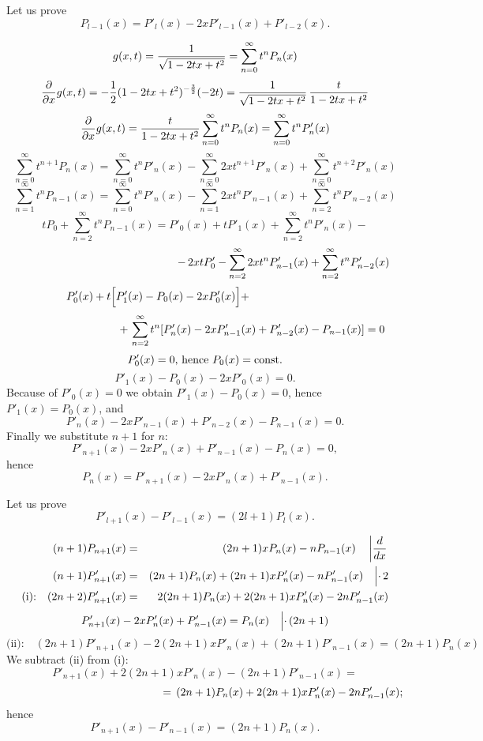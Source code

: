 Let us prove
\begin{equation}
P_{l-1}(x)=P'_l(x)-2xP'_{l-1}(x)+P'_{l-2}(x) .
\end{equation}

{\color{OliveGreen}
\bproof


$$
   g(x,t)={1\over\sqrt{1-2tx+t^2}}=\sum_{n=0}^\infty t^nP_n(x)
$$
$$
   {\partial\over\partial x}g(x,t)=-{1\over 2}(1-2tx+t^2)^{-{3\over 2}}
   (-2t)={1\over\sqrt{1-2tx+t^2}}\,{t\over1-2tx+t^2}
$$
$$
   {\partial\over\partial x}g(x,t)={t\over1-2tx+t^2}
   \sum_{n=0}^\infty t^nP_n(x)=\sum_{n=0}^\infty t^{n}P'_n(x)
$$
$$
   \sum_{n=0}^\infty t^{n+1}P_n(x)=\sum_{n=0}^\infty t^{n}P'_n(x)-
   \sum_{n=0}^\infty 2xt^{n+1}P'_n(x)+\sum_{n=0}^\infty t^{n+2}P'_n(x)
$$
$$
   \sum_{n=1}^\infty t^{n}P_{n-1}(x)=\sum_{n=0}^\infty t^{n}P'_n(x)-
   \sum_{n=1}^\infty 2xt^{n}P'_{n-1}(x)+\sum_{n=2}^\infty t^{n}P'_{n-2}(x)
$$
$$
   tP_0+\sum_{n=2}^\infty t^{n}P_{n-1}(x)=P'_0(x)+tP'_1(x)+
   \sum_{n=2}^\infty t^{n}P'_n(x)-
$$
$$
   \hspace*{5cm}-\,2xtP'_0-\sum_{n=2}^\infty 2xt^{n}P'_{n-1}(x)+
   \sum_{n=2}^\infty t^{n}P'_{n-2}(x)
$$
$$
   P'_0(x)+t\Bigl[P'_1(x)-P_0(x)-2xP'_0(x)\Bigr]+\hspace*{3cm}
$$
$$
   \hspace*{3cm}+\,\sum_{n=2}^\infty t^{n}[P'_n(x)-2xP'_{n-1}(x)+P'_{n-2}(x)-
   P_{n-1}(x)]=0
$$
$$
   P'_0(x)=0\textrm{, hence } P_0(x)={\rm const.}
$$
$$
   P'_1(x)-P_0(x)-2xP'_0(x)=0.
$$
Because of $P'_0(x)=0$ we obtain $P'_1(x)-P_0(x)=0$, hence $P'_1(x)=P_0(x)$, and
$$
   P'_n(x)-2xP'_{n-1}(x)+P'_{n-2}(x)-P_{n-1}(x)=0.
$$
Finally we substitute $n+1$ for $n$:
$$
   P'_{n+1}(x)-2xP'_{n}(x)+P'_{n-1}(x)-P_{n}(x)=0,
$$
hence
$$
    P_n(x)=P'_{n+1}(x)-2xP'_{n}(x)+P'_{n-1}(x).
$$

\eproof
}

Let us prove
\begin{equation}
P'_{l+1}(x)-P'_{l-1}(x)=(2l+1)P_l(x) .
\end{equation}

{\color{OliveGreen}
\bproof

\begin{eqnarray*}
   (n+1)P_{n+1}(x)&=&(2n+1)xP_n(x)-nP_{n-1}(x)\quad\left|
   {d\over dx}\right.\\
   (n+1)P'_{n+1}(x)&=&(2n+1)P_n(x)+(2n+1)xP'_n(x)-nP'_{n-1}(x)
   \quad\Bigl|\cdot\,2\\
   \textrm{(i):}\quad(2n+2)P'_{n+1}(x)&=&2(2n+1)P_n(x)+2(2n+1)xP'_n(x)-2nP'_{n-1}(x)
\end{eqnarray*}
$$
   P'_{n+1}(x)-2xP'_{n}(x)+P'_{n-1}(x)=P_{n}(x)\quad\Bigl|
   \cdot\,(2n+1)
$$
$$
   \textrm{(ii):}\quad (2n+1)P'_{n+1}(x)-2(2n+1)xP'_{n}(x)+(2n+1)P'_{n-1}(x)=
   (2n+1)P_{n}(x)
$$
We subtract (ii) from (i):
$$
   P'_{n+1}(x)+2(2n+1)xP'_n(x)-(2n+1)P'_{n-1}(x)=
$$
$$
   \hspace*{5cm}=\,(2n+1)P_n(x)+2(2n+1)xP'_n(x)-2nP'_{n-1}(x);
$$
hence
$$
   P'_{n+1}(x)-P'_{n-1}(x)=(2n+1)P_n(x).
$$
\eproof
}

